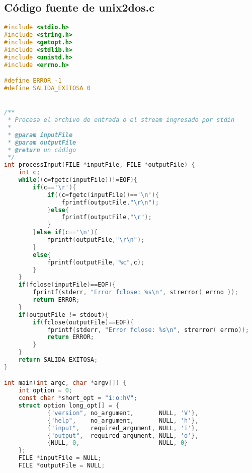 \documentclass[a4paper]{article}
\begin{document}
\subsection{Código fuente de unix2dos.c}
\lstset{breaklines=true}
\begin{lstlisting}[language=C]
#include <stdio.h>
#include <string.h>
#include <getopt.h>
#include <stdlib.h>
#include <unistd.h>
#include <errno.h>

#define ERROR -1
#define SALIDA_EXITOSA 0


/**
 * Procesa el archivo de entrada o el stream ingresado por stdin
 *
 * @param inputFile
 * @param outputFile
 * @return un código
 */
int processInput(FILE *inputFile, FILE *outputFile) {
    int c;
    while((c=fgetc(inputFile))!=EOF){
        if(c=='\r'){
            if((c=fgetc(inputFile))=='\n'){
            	fprintf(outputFile,"\r\n");
            }else{
            	fprintf(outputFile,"\r");
            }
        }else if(c=='\n'){
        	fprintf(outputFile,"\r\n");
        }
        else{
            fprintf(outputFile,"%c",c);
        }
    }
    if(fclose(inputFile)==EOF){
        fprintf(stderr, "Error fclose: %s\n", strerror( errno ));
        return ERROR;
    }
    if(outputFile != stdout){
        if(fclose(outputFile)==EOF){
            fprintf(stderr, "Error fclose: %s\n", strerror( errno));
            return ERROR;
        }
    }
    return SALIDA_EXITOSA;
}

int main(int argc, char *argv[]) {
    int option = 0;
    const char *short_opt = "i:o:hV";
    struct option long_opt[] = {
            {"version", no_argument,       NULL, 'V'},
            {"help",    no_argument,       NULL, 'h'},
            {"input",   required_argument, NULL, 'i'},
            {"output",  required_argument, NULL, 'o'},
            {NULL, 0,                      NULL, 0}
    };
    FILE *inputFile = NULL;
    FILE *outputFile = NULL;


\end{lstlisting}
\end{document}
